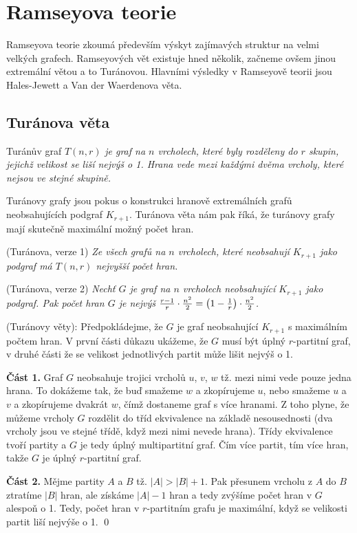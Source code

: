 \section{Ramseyova teorie}
Ramseyova teorie zkoumá především výskyt zajímavých struktur na velmi velkých grafech. Ramseyových vět existuje hned několik, začneme ovšem jinou extremální větou a to Turánovou. Hlavními výsledky v Ramseyově teorii jsou Hales-Jewett a Van der Waerdenova věta.

\subsection{Turánova věta}

\df Turánův graf $T(n,r)$ {\it je graf na $n$ vrcholech, které byly rozděleny do $r$ skupin, jejichž velikost se liší nejvýš o 1. Hrana vede mezi každými dvěma vrcholy, které nejsou ve stejné skupině.}

Turánovy grafy jsou pokus o konstrukci hranově extremálních grafů neobsahujících podgraf $K_{r+1}$. Turánova věta nám pak říká, že turánovy grafy mají skutečně maximální možný počet hran.

\vt (Turánova, verze 1) {\it Ze všech grafů na $n$ vrcholech, které neobsahují $K_{r+1}$ jako podgraf má $T(n,r)$ nejvyšší počet hran.}

\vt (Turánova, verze 2) {\it Nechť $G$ je graf na $n$ vrcholech neobsahující $K_{r+1}$ jako podgraf. Pak počet hran $G$ je nejvýš ${r-1\over r}\cdot{n^2\over 2} = \left(1-{1\over r}\right)\cdot{n^2\over 2}$.}

\dk (Turánovy věty): Předpokládejme, že $G$ je graf neobsahující $K_{r+1}$ s maximálním počtem hran. V první části důkazu ukážeme, že $G$ musí být úplný $r$-partitní graf, v druhé části že se velikost jednotlivých partit může lišit nejvýš o 1.

\textbf{Část 1.} Graf $G$ neobsahuje trojici vrcholů $u$, $v$, $w$ tž. mezi nimi vede pouze jedna hrana. To dokážeme tak, že buď smažeme $w$ a zkopírujeme $u$, nebo smažeme $u$ a $v$ a zkopírujeme dvakrát $w$, čímž dostaneme graf s více hranami. Z toho plyne, že můžeme vrcholy $G$ rozdělit do tříd ekvivalence na základě nesousednosti (dva vrcholy jsou ve stejné třídě, když mezi nimi nevede hrana). Třídy ekvivalence tvoří partity a $G$ je tedy úplný multipartitní graf. Čím více partit, tím více hran, takže $G$ je úplný $r$-partitní graf.

\textbf{Část 2.} Mějme partity $A$ a $B$ tž. $|A| > |B| + 1$. Pak přesunem vrcholu z $A$ do $B$ ztratíme $|B|$ hran, ale získáme $|A|-1$ hran a tedy zvýšíme počet hran v $G$ alespoň o 1. Tedy, počet hran v $r$-partitním grafu je maximální, když se velikosti partit liší nejvýše o 1.
\qed

